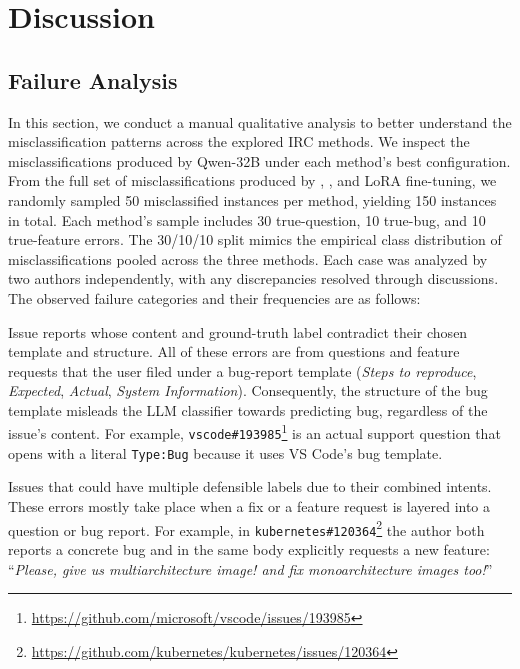 
\section{Discussion}
\label{sec:discussion}

\subsection{Failure Analysis}
\label{sec:disc-failures}

In this section, we conduct a manual qualitative analysis to better understand the misclassification patterns across the explored IRC methods. We inspect the misclassifications produced by Qwen-32B under each method's best configuration. 
From the full set of misclassifications produced by \ragtag, \bragtag, and LoRA fine-tuning, we randomly sampled 50 misclassified instances per method, yielding 150 instances in total. Each method's sample includes 30 true-question, 10 true-bug, and 10 true-feature errors. The 30/10/10 split mimics the empirical class distribution of misclassifications pooled across the three methods. Each case was analyzed by two authors independently, with any discrepancies resolved through discussions. The observed failure categories and their frequencies are as follows:

 Issue reports whose content and ground-truth label contradict their chosen template and structure. All of these errors are from questions and feature requests that the user filed under a bug-report template (\textit{Steps to reproduce}, \textit{Expected}, \textit{Actual}, \textit{System Information}). Consequently, the structure of the bug template misleads the LLM classifier towards predicting bug, regardless of the issue's content. For example, \texttt{vscode\#193985}\footnote{\url{https://github.com/microsoft/vscode/issues/193985}} is an actual support question that opens with a literal \texttt{Type:Bug} because it uses VS Code's bug template.

 Issues that could have multiple defensible labels due to their combined intents. These errors mostly take place when a fix or a feature request is layered into a question or bug report. For example, in \texttt{kubernetes\#120364}\footnote{\url{https://github.com/kubernetes/kubernetes/issues/120364}} the author both reports a concrete bug and in the same body explicitly requests a new feature: ``\textit{Please, give us multiarchitecture image! and fix monoarchitecture images too!}'' 

